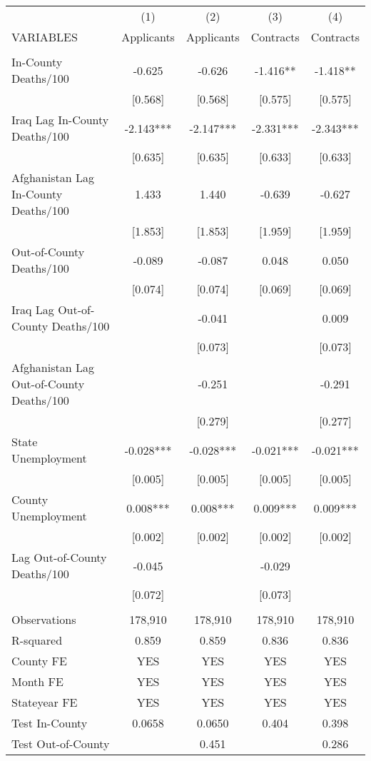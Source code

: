 \documentclass[]{article}
\begin{document}
\begin{tabular}{lcccc} \hline
 & (1) & (2) & (3) & (4) \\
VARIABLES & Applicants & Applicants & Contracts & Contracts \\ \hline
 &  &  &  &  \\
In-County Deaths/100 & -0.625 & -0.626 & -1.416** & -1.418** \\
 & [0.568] & [0.568] & [0.575] & [0.575] \\
Iraq Lag In-County Deaths/100 & -2.143*** & -2.147*** & -2.331*** & -2.343*** \\
 & [0.635] & [0.635] & [0.633] & [0.633] \\
Afghanistan Lag In-County Deaths/100 & 1.433 & 1.440 & -0.639 & -0.627 \\
 & [1.853] & [1.853] & [1.959] & [1.959] \\
Out-of-County Deaths/100 & -0.089 & -0.087 & 0.048 & 0.050 \\
 & [0.074] & [0.074] & [0.069] & [0.069] \\
Iraq Lag Out-of-County Deaths/100 &  & -0.041 &  & 0.009 \\
 &  & [0.073] &  & [0.073] \\
Afghanistan Lag Out-of-County Deaths/100 &  & -0.251 &  & -0.291 \\
 &  & [0.279] &  & [0.277] \\
State Unemployment & -0.028*** & -0.028*** & -0.021*** & -0.021*** \\
 & [0.005] & [0.005] & [0.005] & [0.005] \\
County Unemployment & 0.008*** & 0.008*** & 0.009*** & 0.009*** \\
 & [0.002] & [0.002] & [0.002] & [0.002] \\
Lag Out-of-County Deaths/100 & -0.045 &  & -0.029 &  \\
 & [0.072] &  & [0.073] &  \\
 &  &  &  &  \\
Observations & 178,910 & 178,910 & 178,910 & 178,910 \\
R-squared & 0.859 & 0.859 & 0.836 & 0.836 \\
County FE & YES & YES & YES & YES \\
Month FE & YES & YES & YES & YES \\
Stateyear FE & YES & YES & YES & YES \\
Test In-County & 0.0658 & 0.0650 & 0.404 & 0.398 \\
 Test Out-of-County &  & 0.451 &  & 0.286 \\ \hline

\end{tabular}
\end{document}
